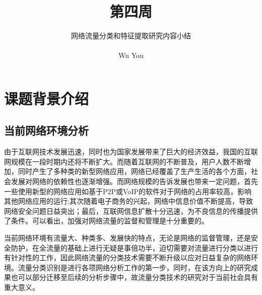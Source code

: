 \documentclass[a4papper]{article}
\title{}
\title{第四周}
\author{网络流量分类和特征提取研究内容小结\\\\
Wu You\\
}
\begin{document}
\maketitle
\tableofcontents
\thispagestyle{empty}%
\newpage
\setcounter{page}{1}%
\setcounter{section}{0}%
\section{课题背景介绍}
\subsection{当前网络环境分析}
\par\setlength{\parindent}{2em} %
由于互联网技术发展迅速，同时也为国家发展带来了巨大的经济效益，我国的互联网规模在一段时期内还将不断扩大。而随着互联网的不断普及，用户人数不断增加，同时产生了多种类的新型网络应用，网络已经覆盖了生产生活的各个方面，社会发展对网络的依赖性也逐渐增强。而网络规模的告诉发展也带来一定问题，首先一些使用新型的网络应用如基于P2P或VoIP的软件对于网络的占用率较高，影响其他网络应用的运行;其次随着电子商务的兴起，网络中信息价值不断提高，导致网络安全问题日益突出；最后，互联网信息扩散十分迅速，为不良信息的传播提供了条件。\cite{林冠洲2011网络流量识别关键技术研究}可以看出，加强对网络流量的监督和管理是十分重要的。
\par\setlength{\parindent}{2em} %
当前网络环境有流量大、种类多、发展快的特点，无论是网络的监督管理，还是安全防护，在全流量的基础上进行无疑是事倍功半，迫切需要对流量进行分类以进行有针对性的工作，因此网络流量的分类技术需要不断升级以应对日益复杂的网络环境。流量分类识别是进行各项网络分析工作的第一步，同时，在该方向上的研究成果也可以部分迁移至后续的分析步骤中，故流量分类技术的研究对于当前社会具有重大意义。
\end{document}
